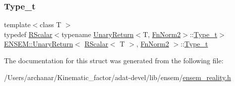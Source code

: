 \mbox{\label{structENSEM_1_1UnaryReturn_3_01RScalar_3_01T_01_4_00_01FnNorm2_01_4_a0b95acf355311a4c109012c267496961}} 
\subsubsection{\texorpdfstring{Type\_t}{Type\_t}\hspace{0.1cm}{\footnotesize\ttfamily [3/3]}}
{\footnotesize\ttfamily template$<$class T $>$ \\
typedef \mbox{\hyperlink{classENSEM_1_1RScalar}{R\+Scalar}}$<$typename \mbox{\hyperlink{structENSEM_1_1UnaryReturn}{Unary\+Return}}$<$T, \mbox{\hyperlink{structENSEM_1_1FnNorm2}{Fn\+Norm2}}$>$\+::\mbox{\hyperlink{structENSEM_1_1UnaryReturn_3_01RScalar_3_01T_01_4_00_01FnNorm2_01_4_a0b95acf355311a4c109012c267496961}{Type\+\_\+t}}$>$ \mbox{\hyperlink{structENSEM_1_1UnaryReturn}{E\+N\+S\+E\+M\+::\+Unary\+Return}}$<$ \mbox{\hyperlink{classENSEM_1_1RScalar}{R\+Scalar}}$<$ T $>$, \mbox{\hyperlink{structENSEM_1_1FnNorm2}{Fn\+Norm2}} $>$\+::\mbox{\hyperlink{structENSEM_1_1UnaryReturn_3_01RScalar_3_01T_01_4_00_01FnNorm2_01_4_a0b95acf355311a4c109012c267496961}{Type\+\_\+t}}}



The documentation for this struct was generated from the following file\+:\begin{DoxyCompactItemize}
\item 
/\+Users/archanar/\+Kinematic\+\_\+factor/adat-\/devel/lib/ensem/\mbox{\hyperlink{adat-devel_2lib_2ensem_2ensem__reality_8h}{ensem\+\_\+reality.\+h}}\end{DoxyCompactItemize}
